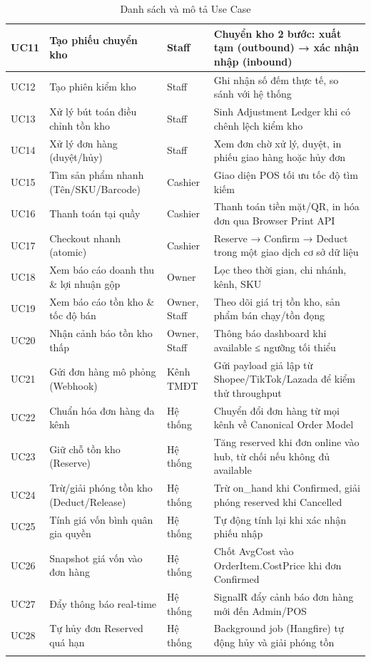 \begin{longtable}{|p{1.2cm}|p{4.2cm}|p{3.3cm}|p{8.9cm}|}
    \hline
    UC11 & Tạo phiếu chuyển kho & Staff & Chuyển kho 2 bước: xuất tạm (outbound) → xác nhận nhập (inbound) \\
    \hline
    UC12 & Tạo phiên kiểm kho & Staff & Ghi nhận số đếm thực tế, so sánh với hệ thống \\
    \hline
    UC13 & Xử lý bút toán điều chỉnh tồn kho & Staff & Sinh Adjustment Ledger khi có chênh lệch kiểm kho \\
    \hline
    UC14 & Xử lý đơn hàng (duyệt/hủy) & Staff & Xem đơn chờ xử lý, duyệt, in phiếu giao hàng hoặc hủy đơn \\
    \hline
    UC15 & Tìm sản phẩm nhanh (Tên/SKU/Barcode) & Cashier & Giao diện POS tối ưu tốc độ tìm kiếm \\
    \hline
    UC16 & Thanh toán tại quầy & Cashier & Thanh toán tiền mặt/QR, in hóa đơn qua Browser Print API \\
    \hline
    UC17 & Checkout nhanh (atomic) & Cashier & Reserve → Confirm → Deduct trong một giao dịch cơ sở dữ liệu \\
    \hline
    UC18 & Xem báo cáo doanh thu \& lợi nhuận gộp & Owner & Lọc theo thời gian, chi nhánh, kênh, SKU \\
    \hline
    UC19 & Xem báo cáo tồn kho \& tốc độ bán & Owner, Staff & Theo dõi giá trị tồn kho, sản phẩm bán chạy/tồn đọng \\
    \hline
    UC20 & Nhận cảnh báo tồn kho thấp & Owner, Staff & Thông báo dashboard khi available ≤ ngưỡng tối thiểu \\
    \hline
    UC21 & Gửi đơn hàng mô phỏng (Webhook) & Kênh TMĐT & Gửi payload giả lập từ Shopee/TikTok/Lazada để kiểm thử throughput \\
    \hline
    UC22 & Chuẩn hóa đơn hàng đa kênh & Hệ thống & Chuyển đổi đơn hàng từ mọi kênh về Canonical Order Model \\
    \hline
    UC23 & Giữ chỗ tồn kho (Reserve) & Hệ thống & Tăng reserved khi đơn online vào hub, từ chối nếu không đủ available \\
    \hline
    UC24 & Trừ/giải phóng tồn kho (Deduct/Release) & Hệ thống & Trừ on\_hand khi Confirmed, giải phóng reserved khi Cancelled \\
    \hline
    UC25 & Tính giá vốn bình quân gia quyền & Hệ thống & Tự động tính lại khi xác nhận phiếu nhập \\
    \hline
    UC26 & Snapshot giá vốn vào đơn hàng & Hệ thống & Chốt AvgCost vào OrderItem.CostPrice khi đơn Confirmed \\
    \hline
    UC27 & Đẩy thông báo real-time & Hệ thống & SignalR đẩy cảnh báo đơn hàng mới đến Admin/POS \\
    \hline
    UC28 & Tự hủy đơn Reserved quá hạn & Hệ thống & Background job (Hangfire) tự động hủy và giải phóng tồn \\
    \hline
    \caption{Danh sách và mô tả Use Case}
    \label{tab:usecases}
\end{longtable}
